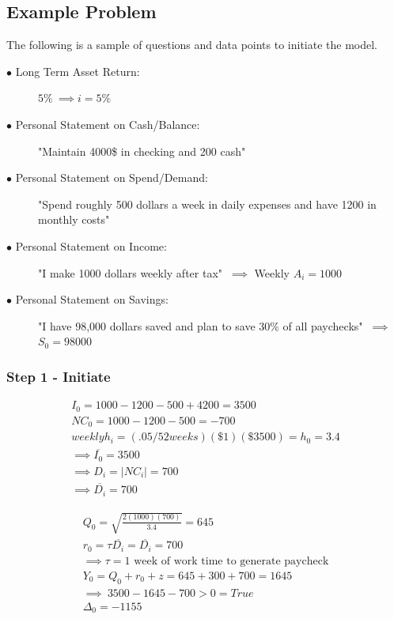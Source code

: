 \documentclass{article}
\begin{document}
\subsection{Example Problem}

The following is a sample of questions and data points to initiate the model. 

\begin{description}
	\item[$\bullet$ Long Term Asset Return:] $5\% \: \implies i = 5\%$
	\item[$\bullet$ Personal Statement on Cash/Balance:] "Maintain 4000\$ in checking and 200 cash"
	\item[$\bullet$ Personal Statement on Spend/Demand:] "Spend roughly 500 dollars a week in daily expenses and have 1200 in monthly costs"
	\item[$\bullet$ Personal Statement on Income:] "I make 1000 dollars weekly after tax" $\: \implies$ Weekly $A_{i} =  1000 $
	\item[$\bullet$ Personal Statement on Savings:] "I have 98,000 dollars saved and plan to save 30\% of all paychecks" $\: \implies$ \: $S_{0} =  98000 $
	\subitem[$\implies \: z =  1000*.3 = 300 $]
\end{description}

\subsubsection{Step 1 - Initiate}

\begin{equation}
	\begin{split}
		I_{0} = 1000 - 1200 -500 + 4200 = 3500\\
		NC_{0} = 1000 - 1200 - 500 = -700\\
		weekly h_{i} = (.05/52 weeks)(\$1)(\$3500) = h_{0} = 3.4 \\
		\implies \overline{I_{0}} =  3500 \\
		\implies D_{i} = |NC_{i}|  = 700 \\
		\implies \overline{D_{i}} = 700 
	\end{split}
\end{equation}
\FloatBarrier

\begin{equation}
	\begin{split}
		Q_{0} =  \sqrt{\frac{2(1000)(700)}{3.4}} = 645\\
		r_{0} =  \tau\overline{D_{i}} = \overline{D_{i}} = 700\\
		\implies \tau = \text{1 week of work time to generate paycheck}\\
		Y_{0} = Q_{0} + r_{0} + z = 645 + 300 + 700 = 1645\\
		\implies \: 3500 - 1645 - 700 > 0  = True \\
		\Delta_{0} = -1155
	\end{split}
\end{equation}
\FloatBarrier
\end{document}
